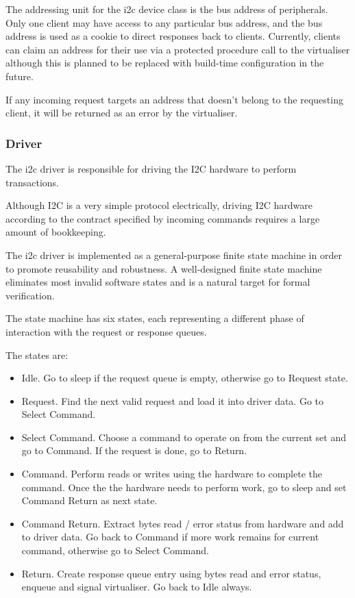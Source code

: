 \documentclass[a4paper,12pt]{report}
\begin{document}
The addressing unit for the \gls{i2c} device class is the bus address of peripherals.
Only one client may have access to any particular bus address, and the bus address is
used as a cookie to direct responses back to clients. Currently, clients can claim an
address for their use via a protected procedure call to the virtualiser although this
is planned to be replaced with build-time configuration in the future.

If any incoming request targets an address that doesn't belong to the requesting client,
it will be returned as an error by the virtualiser.

\subsubsection{Driver}

The \gls{i2c} driver is responsible for driving the I2C hardware to perform transactions.

Although I2C is a very simple protocol electrically, driving I2C hardware according
to the contract specified by incoming commands requires a large amount of bookkeeping.

The \gls{i2c} driver is implemented as a general-purpose finite state machine in order
to promote reusability and robustness. A well-designed finite state machine eliminates
most invalid software states and is a natural target for formal verification.

The state machine has six states, each representing a different phase of interaction with
the request or response queues.

The states are:
\begin{itemize}
  \item Idle. Go to sleep if the request queue is empty, otherwise go to Request state.
  \item Request. Find the next valid request and load it into driver data. Go to Select Command.
  \item Select Command. Choose a command to operate on from the current set and go to Command.
    If the request is done, go to Return.
  \item Command. Perform reads or writes using the hardware to complete the command. Once
    the the hardware needs to perform work, go to sleep and set Command Return as next state.
  \item Command Return. Extract bytes read / error status from hardware and add to driver data.
    Go back to Command if more work remains for current command, otherwise go to Select Command.
  \item Return. Create response queue entry using bytes read and error status, enqueue and
    signal virtualiser. Go back to Idle always.
\end{itemize}
\end{document}
